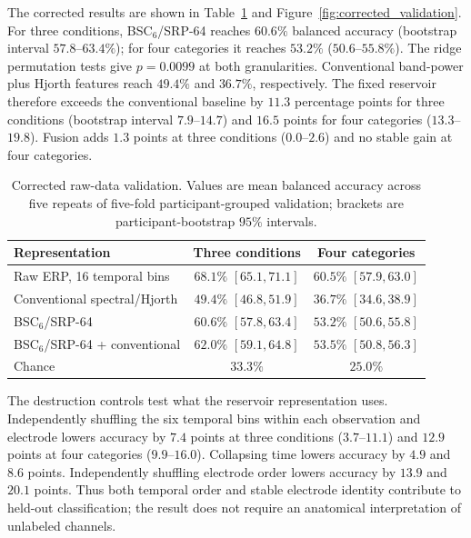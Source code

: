 The corrected results are shown in Table~\ref{tab:corrected_validation} and Figure~\ref{fig:corrected_validation}. For three conditions, BSC$_6$/SRP-64 reaches $60.6\%$ balanced accuracy (bootstrap interval $57.8$--$63.4\%$); for four categories it reaches $53.2\%$ ($50.6$--$55.8\%$). The ridge permutation tests give $p=0.0099$ at both granularities. Conventional band-power plus Hjorth features reach $49.4\%$ and $36.7\%$, respectively. The fixed reservoir therefore exceeds the conventional baseline by $11.3$ percentage points for three conditions (bootstrap interval $7.9$--$14.7$) and $16.5$ points for four categories ($13.3$--$19.8$). Fusion adds $1.3$ points at three conditions ($0.0$--$2.6$) and no stable gain at four categories.

\begin{table}[t]
\centering
\caption{Corrected raw-data validation. Values are mean balanced accuracy across five repeats of five-fold participant-grouped validation; brackets are participant-bootstrap $95\%$ intervals.}
\label{tab:corrected_validation}
\small
\begin{tabular}{lcc}
\hline
\textbf{Representation} & \textbf{Three conditions} & \textbf{Four categories} \\
\hline
Raw ERP, 16 temporal bins & $68.1\%$ $[65.1,71.1]$ & $60.5\%$ $[57.9,63.0]$ \\
Conventional spectral/Hjorth & $49.4\%$ $[46.8,51.9]$ & $36.7\%$ $[34.6,38.9]$ \\
BSC$_6$/SRP-64 & $60.6\%$ $[57.8,63.4]$ & $53.2\%$ $[50.6,55.8]$ \\
BSC$_6$/SRP-64 + conventional & $62.0\%$ $[59.1,64.8]$ & $53.5\%$ $[50.8,56.3]$ \\
\hline
Chance & $33.3\%$ & $25.0\%$ \\
\hline
\end{tabular}
\end{table}

The destruction controls test what the reservoir representation uses. Independently shuffling the six temporal bins within each observation and electrode lowers accuracy by $7.4$ points at three conditions ($3.7$--$11.1$) and $12.9$ points at four categories ($9.9$--$16.0$). Collapsing time lowers accuracy by $4.9$ and $8.6$ points. Independently shuffling electrode order lowers accuracy by $13.9$ and $20.1$ points. Thus both temporal order and stable electrode identity contribute to held-out classification; the result does not require an anatomical interpretation of unlabeled channels.

